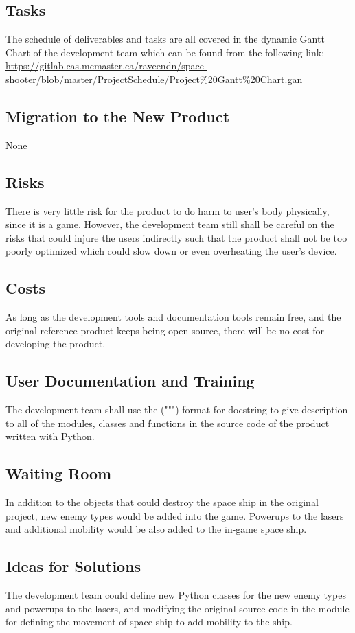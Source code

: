 \documentclass[12pt, titlepage]{article}
\begin{document}
\subsection{Tasks}

The schedule of deliverables and tasks are all covered in the dynamic Gantt Chart of the development team which can be found from the following link:
 \url{https://gitlab.cas.mcmaster.ca/raveendn/space-shooter/blob/master/ProjectSchedule/Project\%20Gantt\%20Chart.gan}

\subsection{Migration to the New Product}
None
\subsection{Risks}
There is very little risk for the product to do harm to user's body physically, since it is a game. However, the development team still shall be careful on the risks that could injure the users indirectly such that the product shall not be too poorly optimized which could slow down or even overheating the user's device.
\subsection{Costs}
As long as the development tools and documentation tools remain free, and the original reference product keeps being open-source, there will be no cost for developing the product.  
\subsection{User Documentation and Training}
The development team shall use the (""") format for docstring to give description to all of the modules, classes and functions in the source code of the product written with Python. 
\subsection{Waiting Room}
In addition to the objects that could destroy the space ship in the original project, new enemy types would be added into the game. Powerups to the lasers and additional mobility would be also added to the in-game space ship.

\subsection{Ideas for Solutions}
The development team could define new Python classes for the new enemy types and powerups to the lasers, and modifying the original source code in the module for defining the movement of space ship to add mobility to the ship.
\end{document}

